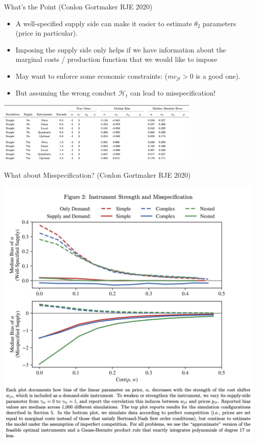 \documentclass[xcolor=pdftex,dvipsnames,table,mathserif,aspectratio=169]{beamer}
\begin{document}
\begin{frame}{What's the Point (Conlon Gortmaker RJE 2020)}
\begin{itemize}
\item A well-specified supply side can make it easier to estimate $\theta_2$ parameters (price in particular).
\item Imposing the supply side only helps if we have information about the marginal costs / production function that we would like to impose
\item May want to enforce some economic constraints: ($mc_{jt} > 0$ is a good one).
\item But assuming the wrong conduct $\mathcal{H}_t$ can lead to misspecification!
\end{itemize}
\begin{center}
\includegraphics[width=0.75\textwidth]{resources/supply_table}
\end{center}
\end{frame}



\begin{frame}{What about Misspecification? (Conlon Gortmaker RJE 2020)}
\begin{center}
\includegraphics[height=0.9\textheight]{resources/supply_figure}
\end{center}
\end{frame}
\end{document}

